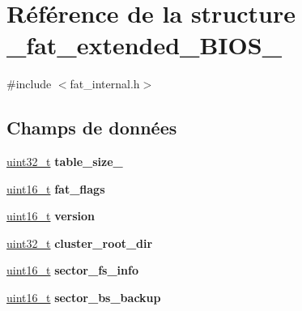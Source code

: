 \hypertarget{struct__fat__extended__BIOS__32}{\section{Référence de la structure \-\_\-fat\-\_\-extended\-\_\-\-B\-I\-O\-S\-\_}
\label{struct__fat__extended__BIOS__32}
}


{\ttfamily \#include $<$fat\-\_\-internal.\-h$>$}

\subsection*{Champs de données}
\begin{DoxyCompactItemize}
\item 
\hypertarget{struct__fat__extended__BIOS__32_afe9918174f4b717fe9ba858b792b6b76}{\hyperlink{types_8h_a33594304e786b158f3fb30289278f5af}{uint32\-\_\-t} {\bfseries table\-\_\-size\-\_}}\label{struct__fat__extended__BIOS__32_afe9918174f4b717fe9ba858b792b6b76}

\item 
\hypertarget{struct__fat__extended__BIOS__32_a58bc295c5eec01f9daec08d84340817e}{\hyperlink{types_8h_adf4d876453337156dde61095e1f20223}{uint16\-\_\-t} {\bfseries fat\-\_\-flags}}\label{struct__fat__extended__BIOS__32_a58bc295c5eec01f9daec08d84340817e}

\item 
\hypertarget{struct__fat__extended__BIOS__32_a9eb3b046449e1e1c868e1ecb1d6a9fe2}{\hyperlink{types_8h_adf4d876453337156dde61095e1f20223}{uint16\-\_\-t} {\bfseries version}}\label{struct__fat__extended__BIOS__32_a9eb3b046449e1e1c868e1ecb1d6a9fe2}

\item 
\hypertarget{struct__fat__extended__BIOS__32_a78cf2bb3768b41a3b054d6c71d5c61e7}{\hyperlink{types_8h_a33594304e786b158f3fb30289278f5af}{uint32\-\_\-t} {\bfseries cluster\-\_\-root\-\_\-dir}}\label{struct__fat__extended__BIOS__32_a78cf2bb3768b41a3b054d6c71d5c61e7}

\item 
\hypertarget{struct__fat__extended__BIOS__32_a38e8b2efc3921f696d435b878fc85007}{\hyperlink{types_8h_adf4d876453337156dde61095e1f20223}{uint16\-\_\-t} {\bfseries sector\-\_\-fs\-\_\-info}}\label{struct__fat__extended__BIOS__32_a38e8b2efc3921f696d435b878fc85007}

\item 
\hypertarget{struct__fat__extended__BIOS__32_aa55ea52137b033ae69f69c4e4e16dc3b}{\hyperlink{types_8h_adf4d876453337156dde61095e1f20223}{uint16\-\_\-t} {\bfseries sector\-\_\-bs\-\_\-backup}}\label{struct__fat__extended__BIOS__32_aa55ea52137b033ae69f69c4e4e16dc3b}


\end{DoxyCompactItemize}
